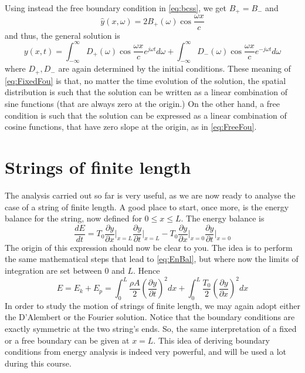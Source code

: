\documentclass[11pt,twoside,a4paper,english]{book}
\begin{document}
\medskip
\medskip


\noindent Using instead the free boundary condition in \eqref{eq:bcss}, we get $B_+ = B_-$ and
\begin{equation}\label{eq:FreeFou}
\hat y(x,\omega) = 2 B_+(\omega) \cos \frac{\omega x}{c}
\end{equation}
and thus, the general solution is
\begin{equation}\label{eq:FreeFou}
y(x,t)= \int_{-\infty}^{\infty} D_+(\omega) \cos\frac{\omega x}{c} e^{j\omega t} d\omega +  \int_{-\infty}^{\infty} D_-(\omega) \cos\frac{\omega x}{c} e^{-j\omega t} d\omega
\end{equation}
where $D_+,D_-$ are again determined by the initial conditions.
These meaning of \eqref{eq:FixedFou} is that, no matter the time evolution of the solution, the spatial distribution is such that the solution can be written as a linear combination of sine functions (that are always zero at the origin.) On the other hand, a free condition is such that the solution can be expressed as a linear combination of cosine functions, that have zero slope at the origin, as in \eqref{eq:FreeFou}.


\section{Strings of finite length}

The analysis carried out so far is very useful, as we are now ready to analyse the case of a string of finite length. A good place to start, once more, is the energy balance for the string, now defined for $0\leq x \leq L$. The energy balance is
\begin{equation}\label{eq:EnBalFull}
\frac{dE}{dt} = T_0 \frac{\partial y}{\partial x }\Bigg|_{x=L}\frac{\partial y}{\partial t }\Bigg|_{x=L} - T_0 \frac{\partial y}{\partial x }\Bigg|_{x=0}\frac{\partial y}{\partial t }\Bigg|_{x=0}
\end{equation}
The origin of this expression should now be clear to you. The idea is to perform the same mathematical steps that lead to \eqref{eq:EnBal}, but where now the limits of integration are set between $0$ and $L$. Hence
\begin{equation}\label{eq:EnFinite}
E = E_k + E_p = \int_{0}^{L} \frac{\rho A}{2}\left( \frac{\partial y}{\partial t} \right)^2 dx + \int_{0}^{L} \frac{T_0}{2}\left( \frac{\partial y}{\partial x} \right)^2 dx
\end{equation}
In order to study the motion of strings of finite length, we may again adopt either the D'Alembert or the Fourier solution. Notice that the boundary conditions are exactly symmetric at the two string's ends. So, the same interpretation of a fixed or a free boundary can be given at $x=L$. This idea of deriving boundary conditions from energy analysis is indeed very powerful, and will be used a lot during this course.
\end{document}
